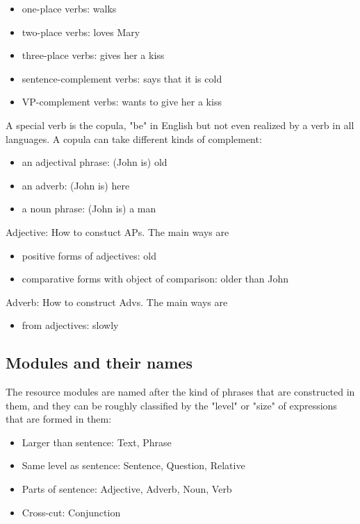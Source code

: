 \documentclass[11pt,a4paper]{article}
\begin{document}
\begin{itemize}
\item one-place verbs: walks
\item two-place verbs: loves Mary
\item three-place verbs: gives her a kiss
\item sentence-complement verbs: says that it is cold
\item VP-complement verbs: wants to give her a kiss
\end{itemize}

A special verb is the copula, "be" in English but not even realized 
by a verb in all languages.
A copula can take different kinds of complement: 

\begin{itemize}
\item an adjectival phrase: (John is) old
\item an adverb: (John is) here
\item a noun phrase: (John is) a man
\end{itemize}

Adjective: How to constuct APs. The main ways are

\begin{itemize}
\item positive forms of adjectives: old
\item comparative forms with object of comparison: older than John
\end{itemize}

Adverb: How to construct Advs. The main ways are

\begin{itemize}
\item from adjectives: slowly
\end{itemize}

\subsection{Modules and their names}
The resource modules are named after the kind of phrases that are constructed in them,
and they can be roughly classified by the "level" or "size" of expressions that are
formed in them:

\begin{itemize}
\item Larger than sentence: Text, Phrase 
\item Same level as sentence: Sentence, Question, Relative
\item Parts of sentence: Adjective, Adverb, Noun, Verb
\item Cross-cut: Conjunction
\end{itemize}
\end{document}
